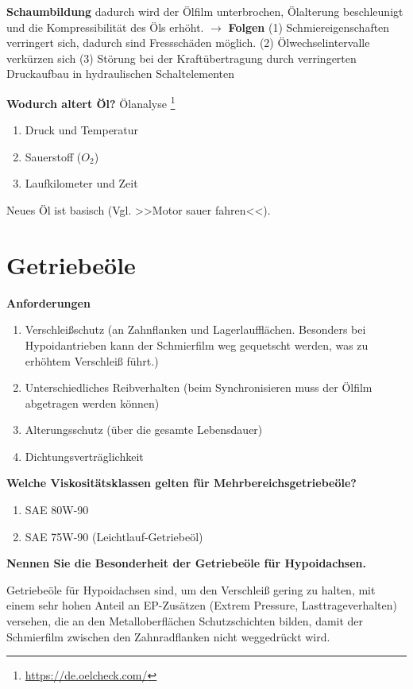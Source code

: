 \textbf{Schaumbildung} dadurch wird der Ölfilm unterbrochen, Ölalterung
beschleunigt und die Kompressibilität des Öls erhöht. $\to$
\textbf{Folgen} (1) Schmiereigenschaften verringert sich, dadurch sind
Fressschäden möglich. (2) Ölwechselintervalle verkürzen sich (3) Störung
bei der Kraftübertragung durch verringerten Druckaufbau in hydraulischen
Schaltelementen

\textbf{Wodurch altert Öl?} Ölanalyse \footnote{\url{https://de.oelcheck.com/}}

\begin{enumerate}
\item
  Druck und Temperatur
\item
  Sauerstoff ($O_2$)
\item
  Laufkilometer und Zeit
\end{enumerate}

Neues Öl ist basisch (Vgl. >>Motor sauer fahren<<).

\section{Getriebeöle}\label{getriebeoele}

\textbf{Anforderungen}

\begin{enumerate}
\item
  Verschleißschutz (an Zahnflanken und Lagerlaufflächen. Besonders bei
  Hypoidantrieben kann der Schmierfilm weg gequetscht werden, was zu
  erhöhtem Verschleiß führt.)
\item
  Unterschiedliches Reibverhalten (beim Synchronisieren muss der Ölfilm
  abgetragen werden können)
\item
  Alterungsschutz (über die gesamte Lebensdauer)
\item
  Dichtungsverträglichkeit
\end{enumerate}

\textbf{Welche Viskositätsklassen gelten für Mehrbereichsgetriebeöle?}

\begin{enumerate}
\item
  SAE 80W-90
\item
  SAE 75W-90 (Leichtlauf-Getriebeöl)
\end{enumerate}

\textbf{Nennen Sie die Besonderheit der Getriebeöle für Hypoidachsen.}

Getriebeöle für Hypoidachsen sind, um den Verschleiß gering zu halten,
mit einem sehr hohen Anteil an EP-Zusätzen (Extrem Pressure,
Lasttrageverhalten) versehen, die an den Metalloberflächen
Schutzschichten bilden, damit der Schmierfilm zwischen den
Zahnradflanken nicht weggedrückt wird.

